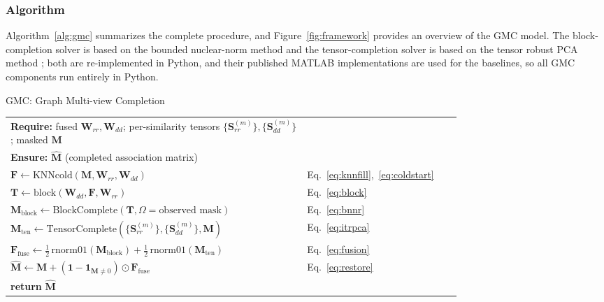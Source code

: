 \documentclass[webpdf,modern,large]{oup-authoring-template}
\newcounter{algline}
\begin{document}
\subsubsection{Algorithm}

Algorithm~\ref{alg:gmc} summarizes the complete procedure, and Figure~\ref{fig:framework} provides an overview of the GMC model. The block-completion solver is based on the bounded nuclear-norm method \citep{yang2019} and the tensor-completion solver is based on the tensor robust PCA method \citep{yang2023itrpc}; both are re-implemented in Python, and their published MATLAB implementations are used for the baselines, so all GMC components run entirely in Python.

\begin{algorithm}[htbp]
\caption{GMC: Graph Multi-view Completion}
\label{alg:gmc}
\small
\setlength{\tabcolsep}{0pt}
\begin{tabular}{@{\stepcounter{algline}\thealgline.\quad}p{0.55\linewidth}@{\quad}p{0.20\linewidth}@{}}
\textbf{Require:} fused $\mathbf{W}_{rr}, \mathbf{W}_{dd}$; per-similarity tensors $\{\mathbf{S}^{(m)}_{rr}\}, \{\mathbf{S}^{(m)}_{dd}\}$; masked $\mathbf{M}$ & \\
\textbf{Ensure:} $\hat{\mathbf{M}}$ (completed association matrix) & \\
$\mathbf{F} \gets \mathrm{KNNcold}(\mathbf{M}, \mathbf{W}_{rr}, \mathbf{W}_{dd})$ & Eq.~\eqref{eq:knnfill},~\eqref{eq:coldstart} \\
$\mathbf{T} \gets \mathrm{block}(\mathbf{W}_{dd}, \mathbf{F}, \mathbf{W}_{rr})$ & Eq.~\eqref{eq:block} \\
$\mathbf{M}_{\text{block}} \gets \mathrm{BlockComplete}(\mathbf{T}, \Omega{=}\text{observed mask})$ & Eq.~\eqref{eq:bnnr} \\
$\mathbf{M}_{\text{ten}} \gets \mathrm{TensorComplete}(\{\mathbf{S}^{(m)}_{rr}\}, \{\mathbf{S}^{(m)}_{dd}\}, \mathbf{M})$ & Eq.~\eqref{eq:itrpca} \\
$\mathbf{F}_{\text{fuse}} \gets \tfrac{1}{2}\,\mathrm{rnorm01}(\mathbf{M}_{\text{block}}) + \tfrac{1}{2}\,\mathrm{rnorm01}(\mathbf{M}_{\text{ten}})$ & Eq.~\eqref{eq:fusion} \\
$\hat{\mathbf{M}} \gets \mathbf{M} + (\mathbf{1} - \mathbf{1}_{\mathbf{M} \neq 0}) \odot \mathbf{F}_{\text{fuse}}$ & Eq.~\eqref{eq:restore} \\
\textbf{return} $\hat{\mathbf{M}}$ & \\
\end{tabular}
\end{algorithm}
\end{document}
